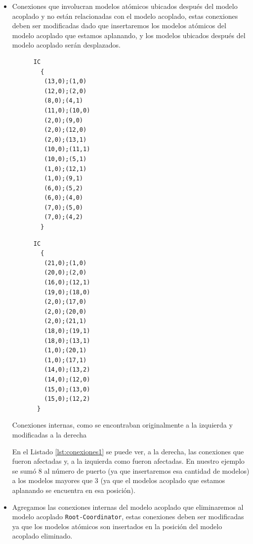 \begin{itemize}
        \item Conexiones que involucran modelos atómicos ubicados después del modelo acoplado y no están relacionadas con el modelo acoplado, 
        estas conexiones deben ser modificadas dado que insertaremos los modelos atómicos del modelo acoplado que estamos aplanando, y los modelos 
        ubicados después del modelo acoplado serán desplazados.
        
\begin{listing}[H]
        \begin{minipage}{0.5\textwidth}
\begin{verbatim}
      IC
        {
         (13,0);(1,0)
         (12,0);(2,0)
         (8,0);(4,1)
         (11,0);(10,0)
         (2,0);(9,0)
         (2,0);(12,0)
         (2,0);(13,1)
         (10,0);(11,1)
         (10,0);(5,1)
         (1,0);(12,1)
         (1,0);(9,1)
         (6,0);(5,2)
         (6,0);(4,0)
         (7,0);(5,0)
         (7,0);(4,2)
        }
\end{verbatim}
        \end{minipage}
        \begin{minipage}{0.5\textwidth}
\begin{verbatim}
      IC
        {
         (21,0);(1,0)
         (20,0);(2,0)
         (16,0);(12,1)
         (19,0);(18,0)
         (2,0);(17,0)
         (2,0);(20,0)
         (2,0);(21,1)
         (18,0);(19,1)
         (18,0);(13,1)
         (1,0);(20,1)
         (1,0);(17,1)
         (14,0);(13,2)
         (14,0);(12,0)
         (15,0);(13,0)
         (15,0);(12,2)
       }
\end{verbatim}
        \end{minipage}
\caption{Conexiones internas, como se encontraban originalmente a la izquierda y modificadas a la derecha}\label{lst:conexiones1}
\end{listing}

        En el Listado \ref{lst:conexiones1} se puede ver, a la derecha, las conexiones que fueron afectadas y, a la izquierda como fueron afectadas. En nuestro ejemplo
        se sumó $8$ al número de puerto (ya que insertaremos esa cantidad de modelos) a los modelos mayores que $3$ (ya que el modelos acoplado que estamos 
	aplanando se encuentra en esa posición).

        \item Agregamos las conexiones internas del modelo acoplado que eliminaremos al modelo acoplado \texttt{Root-Coordinator}, estas conexiones deben ser 
        modificadas ya que los modelos atómicos son insertados en la posición del modelo acoplado eliminado.


\end{itemize}
